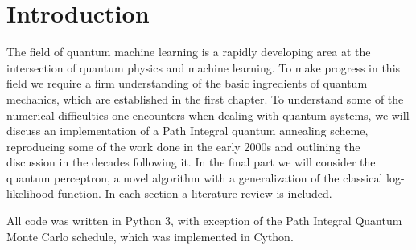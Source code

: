 \chapter{Introduction}

The field of quantum machine learning is a rapidly developing area at the intersection of quantum physics and machine learning. To make progress in this field we require a firm understanding of the basic ingredients of quantum mechanics, which are established in the first chapter. To understand some of the numerical difficulties one encounters when dealing with quantum systems, we will discuss an implementation of a Path Integral quantum annealing scheme, reproducing some of the work done in the early 2000s and outlining the discussion in the decades following it. In the final part we will consider the quantum perceptron, a novel algorithm with a generalization of the classical log-likelihood function.  In each section a literature review is included.

All code was written in Python 3, with exception of the Path Integral Quantum Monte Carlo schedule, which was implemented in Cython. 
